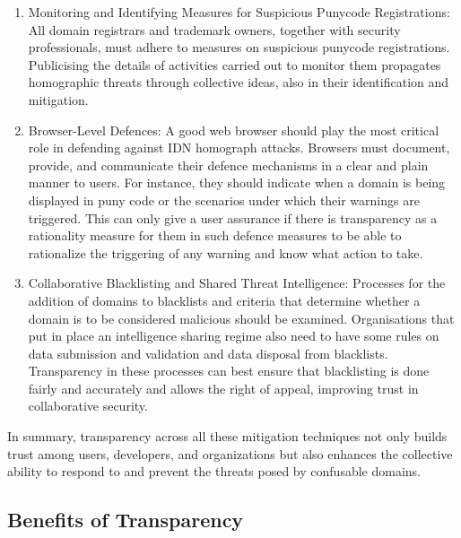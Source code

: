 \begin{itemize}
  \begin{enumerate}
  \item Monitoring and Identifying Measures for Suspicious Punycode Registrations: All domain registrars and trademark owners, together with security professionals, must adhere to measures on suspicious punycode registrations. Publicising the details of activities carried out to monitor them propagates homographic threats through collective ideas, also in their identification and mitigation.
  \item Browser-Level Defences: A good web browser should play the most critical role in defending against IDN homograph attacks. Browsers must document, provide, and communicate their defence mechanisms in a clear and plain manner to users. For instance, they should indicate when a domain is being displayed in puny code or the scenarios under which their warnings are triggered. This can only give a user assurance if there is transparency as a rationality measure for them in such defence measures to be able to rationalize the triggering of any warning and know what action to take.
  \item Collaborative Blacklisting and Shared Threat Intelligence: Processes for the addition of domains to blacklists and criteria that determine whether a domain is to be considered malicious should be examined. Organisations that put in place an intelligence sharing regime also need to have some rules on data submission and validation and data disposal from blacklists. Transparency in these processes can best ensure that blacklisting is done fairly and accurately and allows the right of appeal, improving trust in collaborative security.
\end{enumerate}
  
  
\end{itemize}

In summary, transparency across all these mitigation techniques not only builds trust among users, developers, and organizations but also enhances the collective ability to respond to and prevent the threats posed by confusable domains.

\subsection{Benefits of Transparency }

